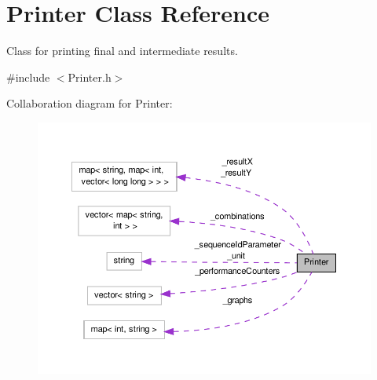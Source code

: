 \hypertarget{classPrinter}{\section{Printer Class Reference}
\label{classPrinter}
}


Class for printing final and intermediate results.  




{\ttfamily \#include $<$Printer.\-h$>$}



Collaboration diagram for Printer\-:\nopagebreak
\begin{figure}[H]
\begin{center}
\leavevmode
\includegraphics[width=350pt]{classPrinter__coll__graph}
\end{center}
\end{figure}
